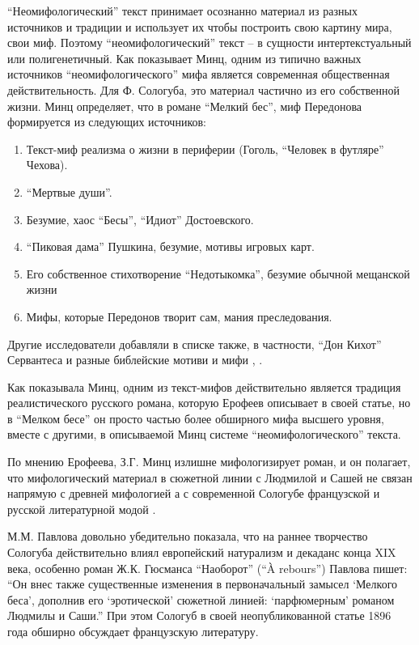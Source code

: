 \documentclass[12pt,a4paper]{article}
\begin{document}
\enquote{Неомифологический} текст принимает осознанно материал из разных источников и традиции и использует их чтобы построить свою картину мира, свои миф. Поэтому \enquote{неомифологический} текст -- в сущности интертекстуальный или полигенетичный. Как показывает Минц, одним из типично важных источников \enquote{неомифологического} мифа является современная общественная действительность. Для Ф. Сологуба, это материал частично из его собственной жизни. Минц определяет, что в романе \enquote{Мелкий бес}, миф Передонова формируется из следующих источников:

\begin{enumerate}[itemsep=0mm, label=\asbuk*)]
\item Текст-миф реализма о жизни в периферии (Гоголь, \enquote{Человек в футляре} Чехова).
\item \enquote{Мертвые души}.
\item Безумие, хаос \enquote{Бесы}, \enquote{Идиот} Достоевского.
\item \enquote{Пиковая дама} Пушкина, безумие, мотивы игровых карт.
\item Его собственное стихотворение \enquote{Недотыкомка}, безумие обычной мещанской жизни
\item Мифы, которые Передонов творит сам, мания преследования.
\end{enumerate}

Другие исследователи добавляли в списке также, в частности, \enquote{Дон Кихот} Сервантеса \parencite{bagno2009} и разные библейские мотиви и мифи \parencite{kobrinski2013}, \parencite[272]{silard1984}.

 
Как показывала Минц, одним из текст-мифов действительно является традиция реалистического русского романа, которую Ерофеев описывает в своей статье, но в \enquote{Мелком бесе} он просто частью более обширного мифа высшего уровня, вместе с другими, в описываемой Минц системе \enquote{неомифологического} текста.

По мнению Ерофеева, З.Г. Минц излишне мифологизирует роман, и он полагает, что мифологический материал в сюжетной линии с Людмилой и Сашей не связан напрямую с древней мифологией а с современной Сологубе французской и русской литературной модой \parencite[152]{jerofeev1985}.

М.М. Павлова довольно убедительно показала, что на раннее творчество Сологуба действительно влиял европейский натурализм и декаданс конца XIX века, особенно роман Ж.К. Гюсманса \enquote{Наоборот} (\enquote{À rebours}) Павлова пишет: \enquote{Он внес также существенные изменения в первоначальный замысел \enquote{Мелкого беса}, дополнив его \enquote{эротической} сюжетной линией: \enquote{парфюмерным} романом Людмилы и Саши.} \parencite*[168.]{pavlova2007} При этом Сологуб в своей неопубликованной статье 1896 года  обширно обсуждает французскую литературу.
\end{document}
